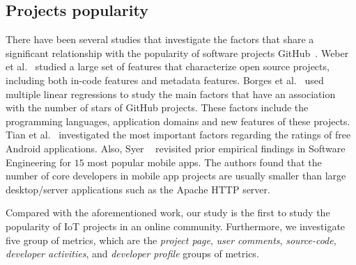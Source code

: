 \subsection{Projects popularity}

There have been several studies that investigate the factors that share a significant relationship with the popularity of software projects
GitHub~\cite{weber2014makes,borges2016understanding,tian2015characteristics,syer2013revisiting}.
Weber et al.~\cite{weber2014makes} studied a large set of features that
characterize open source projects, including both in-code features and metadata
features. 
Borges et al.~\cite{borges2016understanding} used multiple linear regressions
to study the main factors that have an association with the number of stars of
GitHub projects. These factors include the programming languages, application
domains and new features of these projects. Tian et
al.~\cite{tian2015characteristics} investigated the most important factors
regarding the ratings of free Android applications. Also, Syer
\etal~\cite{syer2013revisiting} revisited prior empirical findings in Software
Engineering for $15$ most popular mobile apps. The authors found that the number
of core developers in mobile app projects are usually smaller than large
desktop/server applications such as the Apache HTTP server.

Compared with the aforementioned work, our study is the first to study the popularity of IoT projects in an online community. Furthermore, we investigate
five group of metrics, which are the {\em project page}, {\em user comments},
{\em source-code}, {\em developer activities}, and {\em developer profile}
groups of metrics. 

